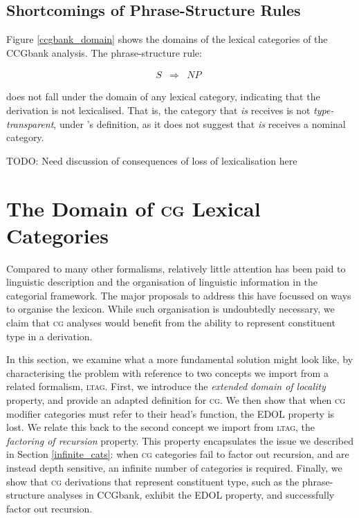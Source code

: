 \documentclass[11pt,twoside,final]{ahudson-harvard}
\newcommand{\ltag}{\textsc{ltag}\xspace}
\newcommand{\ccgbank}{CCGbank\xspace}
\newcommand{\cg}{\textsc{cg}\xspace}
\newcommand{\psrule}[3]{#1&\Rightarrow&#2~~#3}
\newcommand{\term}[1]{\emph{#1}}
\begin{document}
\subsection{Shortcomings of Phrase-Structure Rules}
  
Figure \ref{ccgbank_domain} shows the domains of the lexical categories of the \ccgbank analysis. The phrase-structure rule:
  
\begin{eqnarray}
  \psrule{S}{NP}
 \end{eqnarray}
  
does not fall under the domain of any lexical category, indicating that the derivation is not lexicalised. That is, the category that \emph{is} receives is not \term{type-transparent}, under \citet{steedman:96}'s definition, as it does not suggest that \emph{is} receives a nominal category.
  
  
TODO: Need discussion of consequences of loss of lexicalisation here
  



\section{The Domain of \cg Lexical Categories}


Compared to many other formalisms, relatively little attention has been paid to linguistic description and the organisation of linguistic information in the categorial framework. The major proposals to address this have focussed on ways to organise the lexicon. While such organisation is undoubtedly necessary, we claim that \cg analyses would benefit from the ability to represent constituent type in a derivation.

In this section, we examine what a more fundamental solution might look like, by characterising the problem with reference to two concepts we import from a related formalism, \ltag. First, we introduce the \emph{extended domain of locality} property, and provide an adapted definition for \cg. We then show that when \cg modifier categories must refer to their head's function, the EDOL property is lost. We relate this back to the second concept we import from \ltag, the \emph{factoring of recursion} property. This property encapsulates the issue we described in Section \ref{infinite_cats}: when \cg categories fail to factor out recursion, and are instead depth sensitive, an infinite number of categories is required. Finally, we show that \cg derivations that represent constituent type, such as the phrase-structure analyses in \ccgbank, exhibit the EDOL property, and successfully factor out recursion.
\end{document}
